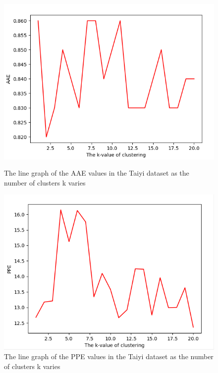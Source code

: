 \documentclass[conference,compsoc]{IEEEtran}
\begin{document}
\begin{figure}[H]
	\begin{minipage}[t]{0.45\linewidth}
		\includegraphics[width=\linewidth]{AAEInTaiyi.png} 
		\caption{The line graph of the AAE values in the Taiyi dataset as the number of clusters k varies} 
		\label{Fig:AAEInTaiyi}
	\end{minipage}%
	\hfill%
	\begin{minipage}[t]{0.45\linewidth}
		\includegraphics[width=\linewidth]{PPEInTaiyi.png}
		\caption{The line graph of the PPE values in the Taiyi dataset as the number of clusters k varies}
		\label{Fig:PPEInTaiyi}
	\end{minipage} 
\end{figure}
\end{document}
